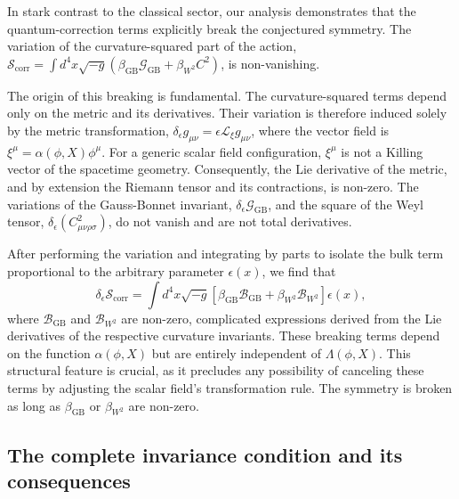 \documentclass[twocolumn]{aastex631}
\begin{document}
In stark contrast to the classical sector, our analysis demonstrates that the quantum-correction terms explicitly break the conjectured symmetry. The variation of the curvature-squared part of the action, $\mathcal{S}_{\text{corr}} = \int d^4x \sqrt{-g} (\beta_{\text{GB}} \mathcal{G}_{\text{GB}} + \beta_{W^2} C^2)$, is non-vanishing.

The origin of this breaking is fundamental. The curvature-squared terms depend only on the metric and its derivatives. Their variation is therefore induced solely by the metric transformation, $\delta_\epsilon g_{\mu\nu} = \epsilon \mathcal{L}_{\xi} g_{\mu\nu}$, where the vector field is $\xi^\mu = \alpha(\phi, X)\phi^\mu$. For a generic scalar field configuration, $\xi^\mu$ is not a Killing vector of the spacetime geometry. Consequently, the Lie derivative of the metric, and by extension the Riemann tensor and its contractions, is non-zero. The variations of the Gauss-Bonnet invariant, $\delta_\epsilon \mathcal{G}_{\text{GB}}$, and the square of the Weyl tensor, $\delta_\epsilon (C_{\mu\nu\rho\sigma}^2)$, do not vanish and are not total derivatives.

After performing the variation and integrating by parts to isolate the bulk term proportional to the arbitrary parameter $\epsilon(x)$, we find that
\begin{equation}
\delta_\epsilon \mathcal{S}_{\text{corr}} = \int d^4x \sqrt{-g} \left[ \beta_{\text{GB}} \mathcal{B}_{\text{GB}} + \beta_{W^2} \mathcal{B}_{W^2} \right] \epsilon(x),
\end{equation}
where $\mathcal{B}_{\text{GB}}$ and $\mathcal{B}_{W^2}$ are non-zero, complicated expressions derived from the Lie derivatives of the respective curvature invariants. These breaking terms depend on the function $\alpha(\phi, X)$ but are entirely independent of $\Lambda(\phi, X)$. This structural feature is crucial, as it precludes any possibility of canceling these terms by adjusting the scalar field's transformation rule. The symmetry is broken as long as $\beta_{\text{GB}}$ or $\beta_{W^2}$ are non-zero.

\subsection{The complete invariance condition and its consequences}
\end{document}
